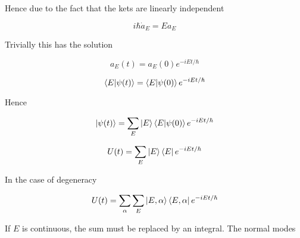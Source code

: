 \documentclass{tufte-book}
\begin{document}
Hence due to the fact that the kets are linearly independent

\begin{equation}
	\label{eq:s4}
	i\hbar\dot{a}_E = Ea_E
\end{equation}

Trivially this has the solution

\begin{equation}
	\label{eq:s5}
	a_E(t) = a_E(0)e^{-iEt/\hbar}
\end{equation}

\begin{equation}
	\label{eq:s6}
	\braket{E|\psi(t)} = \braket{E|\psi(0)}e^{-iEt/\hbar}
\end{equation}

Hence

\begin{equation}
	\label{eq:s7}
	\ket{\psi(t)} = \sum_E\ket{E}\braket{E|\psi(0)}e^{-iEt/\hbar}
\end{equation}

\begin{equation}
	\label{eq:s8}
	U(t) = \sum_E\ket{E}\bra{E}e^{-iEt/\hbar}
\end{equation}

In the case of degeneracy

\begin{equation}
	\label{eq:s9}
	U(t) = \sum_{\alpha}\sum_E\ket{E, \alpha}\bra{E, \alpha}e^{-iEt/\hbar}
\end{equation}

If $E$ is continuous, the sum must be replaced by an integral. The normal modes






\backmatter





\printindex
\end{document}
